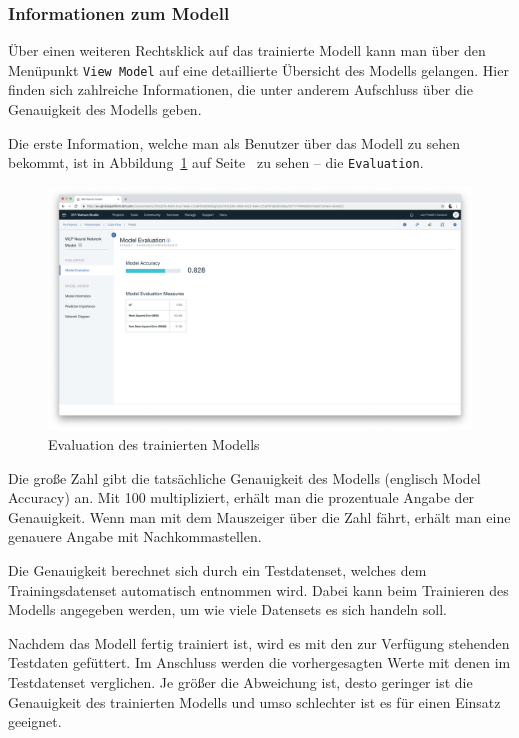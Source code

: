 \subsubsection{Informationen zum Modell}
Über einen weiteren Rechtsklick auf das trainierte Modell kann man über den Menüpunkt \texttt{View Model} auf eine
detaillierte Übersicht des Modells gelangen. Hier finden sich zahlreiche Informationen, die unter anderem Aufschluss
über die Genauigkeit des Modells geben.

Die erste Information, welche man als Benutzer über das Modell zu sehen bekommt, ist in
Abbildung~\ref{fig:umsetzung_model_evaluation} auf Seite~\pageref{fig:umsetzung_model_evaluation} zu sehen -- die
\texttt{Evaluation}.

\begin{figure}[h]
    \centering
    \includegraphics[width=\textwidth]{images/kapitel_3/model_evaluation.png}
    \caption{Evaluation des trainierten Modells}
    \label{fig:umsetzung_model_evaluation}
\end{figure}

Die große Zahl gibt die tatsächliche Genauigkeit des Modells (englisch Model Accuracy) an. Mit 100 multipliziert, erhält
man die prozentuale Angabe der Genauigkeit. Wenn man mit dem Mauszeiger über die Zahl fährt, erhält man eine genauere
Angabe mit Nachkommastellen.

Die Genauigkeit berechnet sich durch ein Testdatenset, welches dem Trainingsdatenset automatisch entnommen wird. Dabei
kann beim Trainieren des Modells angegeben werden, um wie viele Datensets es sich handeln soll.

Nachdem das Modell fertig trainiert ist, wird es mit den zur Verfügung stehenden Testdaten gefüttert. Im Anschluss
werden die vorhergesagten Werte mit denen im Testdatenset verglichen. Je größer die Abweichung ist, desto geringer ist
die Genauigkeit des trainierten Modells und umso schlechter ist es für einen Einsatz geeignet.

